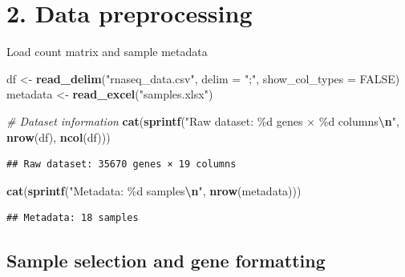 \documentclass[
]{article}
\newenvironment{Shaded}{\begin{snugshade}}{\end{snugshade}}
\newcommand{\AttributeTok}[1]{\textcolor[rgb]{0.13,0.29,0.53}{#1}}
\newcommand{\CommentTok}[1]{\textcolor[rgb]{0.56,0.35,0.01}{\textit{#1}}}
\newcommand{\ConstantTok}[1]{\textcolor[rgb]{0.56,0.35,0.01}{#1}}
\newcommand{\FunctionTok}[1]{\textcolor[rgb]{0.13,0.29,0.53}{\textbf{#1}}}
\newcommand{\NormalTok}[1]{#1}
\newcommand{\OtherTok}[1]{\textcolor[rgb]{0.56,0.35,0.01}{#1}}
\newcommand{\SpecialCharTok}[1]{\textcolor[rgb]{0.81,0.36,0.00}{\textbf{#1}}}
\newcommand{\StringTok}[1]{\textcolor[rgb]{0.31,0.60,0.02}{#1}}
\begin{document}
\section{2. Data preprocessing}\label{data-preprocessing}

Load count matrix and sample metadata

\begin{Shaded}
\begin{Highlighting}[]
\NormalTok{df }\OtherTok{\textless{}{-}} \FunctionTok{read\_delim}\NormalTok{(}\StringTok{"rnaseq\_data.csv"}\NormalTok{, }\AttributeTok{delim =} \StringTok{";"}\NormalTok{, }\AttributeTok{show\_col\_types =} \ConstantTok{FALSE}\NormalTok{)}
\NormalTok{metadata }\OtherTok{\textless{}{-}} \FunctionTok{read\_excel}\NormalTok{(}\StringTok{"samples.xlsx"}\NormalTok{)}

\CommentTok{\# Dataset information}
\FunctionTok{cat}\NormalTok{(}\FunctionTok{sprintf}\NormalTok{(}\StringTok{"Raw dataset: \%d genes × \%d columns}\SpecialCharTok{\textbackslash{}n}\StringTok{"}\NormalTok{, }\FunctionTok{nrow}\NormalTok{(df), }\FunctionTok{ncol}\NormalTok{(df)))}
\end{Highlighting}
\end{Shaded}

\begin{verbatim}
## Raw dataset: 35670 genes × 19 columns
\end{verbatim}

\begin{Shaded}
\begin{Highlighting}[]
\FunctionTok{cat}\NormalTok{(}\FunctionTok{sprintf}\NormalTok{(}\StringTok{"Metadata: \%d samples}\SpecialCharTok{\textbackslash{}n}\StringTok{"}\NormalTok{, }\FunctionTok{nrow}\NormalTok{(metadata)))}
\end{Highlighting}
\end{Shaded}

\begin{verbatim}
## Metadata: 18 samples
\end{verbatim}

\subsection{Sample selection and gene
formatting}\label{sample-selection-and-gene-formatting}
\end{document}
